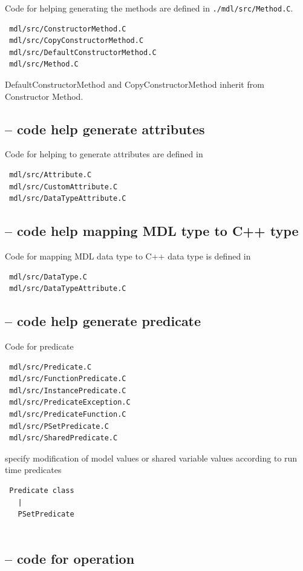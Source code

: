  Code for helping generating the methods are defined in
 \verb!./mdl/src/Method.C!.
 \begin{verbatim}
 mdl/src/ConstructorMethod.C  
 mdl/src/CopyConstructorMethod.C 
 mdl/src/DefaultConstructorMethod.C  
 mdl/src/Method.C
 \end{verbatim}
 DefaultConstructorMethod and CopyConstructorMethod inherit from
 Constructor Method.
 
 
 \subsection{-- code help generate attributes}
 
 Code for helping to generate attributes are defined in
 \begin{verbatim}
 mdl/src/Attribute.C  
 mdl/src/CustomAttribute.C  
 mdl/src/DataTypeAttribute.C
 \end{verbatim}
 
 \subsection{-- code help mapping MDL type to C++ type}
 
 Code for mapping MDL data type to C++ data type is defined in
 \begin{verbatim}
 mdl/src/DataType.C
 mdl/src/DataTypeAttribute.C  
 \end{verbatim}
 
 \subsection{-- code help generate predicate}
 
 Code for predicate
 \begin{verbatim}
 mdl/src/Predicate.C 
 mdl/src/FunctionPredicate.C  
 mdl/src/InstancePredicate.C  
 mdl/src/PredicateException.C  
 mdl/src/PredicateFunction.C  
 mdl/src/PSetPredicate.C  
 mdl/src/SharedPredicate.C
 \end{verbatim}
 
 specify modification of model values or shared variable values according to run
 time predicates
 \begin{verbatim}
 Predicate class
   |
   PSetPredicate
   
 \end{verbatim}
 
 \subsection{-- code for operation}
 
